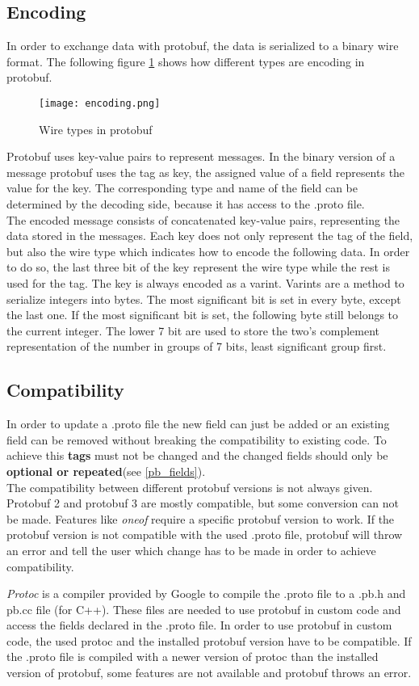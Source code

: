 \subsection{Encoding}
\label{pb_encoding}
In order to exchange data with protobuf, the data is serialized to a binary wire format. The following figure \ref{encoding_table} shows how different types are encoding in protobuf.
\begin{figure}[!hbt]
\texttt{[image: encoding.png]}
\caption{Wire types in protobuf\cite{encoding}}
\label{encoding_table}
\end{figure}
Protobuf uses key-value pairs to represent messages. In the binary version of a message protobuf uses the tag as key, the assigned value of a field represents the value for the key. The corresponding type and name of the field can be determined by the decoding side, because it has access to the .proto file. \\
The encoded message consists of concatenated key-value pairs, representing the data stored in the messages. Each key does not only represent the tag of the field, but also the wire type which indicates how to encode the following data. In order to do so, the last three bit of the key represent the wire type while the rest is used for the tag. The key is always encoded as a varint. Varints are a method to serialize integers into bytes. The most significant bit is set in every byte, except the last one. If the most significant bit is set, the following byte still belongs to the current integer. The lower 7 bit are used to store the two's complement representation of the number in groups of 7 bits, least significant group first.
\subsection{Compatibility}
\label{pb_comp}
In order to update a .proto file the new field can just be added or an existing field can be removed without breaking the compatibility to existing code. To achieve this \textbf{tags} must not be changed and the changed fields should only be \textbf{optional or repeated}(see \ref{pb_fields}).\\
The compatibility between different protobuf versions is not always given. Protobuf 2 and protobuf 3 are mostly compatible, but some conversion can not be made. Features like \emph{oneof} require a specific protobuf version to work. If the protobuf version is not compatible with the used .proto file, protobuf will throw an error and tell the user which change has to be made in order to achieve compatibility.\par
\emph{Protoc} is a compiler provided by Google to compile the .proto file to a .pb.h and pb.cc file (for C++). These files are needed to use protobuf in custom code and access the fields declared in the .proto file. In order to use protobuf in custom code, the used protoc and the installed protobuf version have to be compatible. If the .proto file is compiled with a newer version of protoc than the installed version of protobuf, some features are not available and protobuf throws an error.
